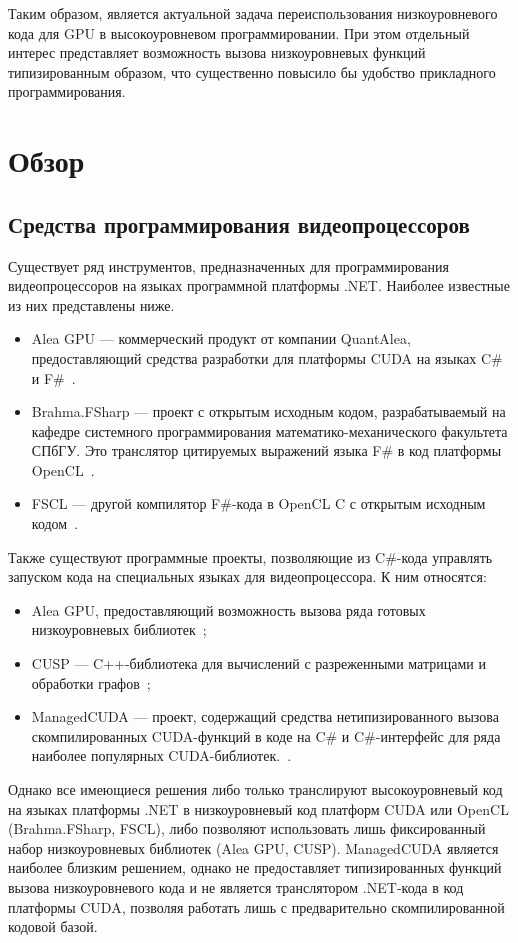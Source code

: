 \documentclass[14pt]{matmex-diploma}
\begin{document}
Таким образом, является актуальной задача переиспользования низкоуровневого кода для GPU в высокоуровневом программировании. При этом отдельный интерес представляет возможность вызова низкоуровневых функций типизированным образом, что существенно повысило бы удобство прикладного программирования.

\section{Обзор}

\subsection{Средства программирования видеопроцессоров}
Существует ряд инструментов, предназначенных для программирования видеопроцессоров на языках программной платформы .NET. Наиболее известные из них представлены ниже.
\begin{itemize}
    \item Alea GPU --- коммерческий продукт от компании QuantAlea, предоставляющий средства разработки для платформы CUDA на языках C\# и F\#~\cite{AleaGPU}.
    \item Brahma.FSharp --- проект с открытым исходным кодом, разрабатываемый на кафедре системного программирования математико-механического факультета СПбГУ. Это транслятор цитируемых выражений языка F\# в код платформы OpenCL~\cite{Brahma_FSharp}.
    \item FSCL --- другой компилятор F\#-кода в OpenCL C с открытым исходным кодом~\cite{FSCL}.
\end{itemize}

Также существуют программные проекты, позволяющие из C\#-кода управлять запуском кода на специальных языках для видеопроцессора. К ним относятся:
\begin{itemize}
    \item Alea GPU, предоставляющий возможность вызова ряда готовых низкоуровневых библиотек~\cite{AleaGPU};
    \item CUSP --- C++-библиотека для вычислений с разреженными матрицами и обработки графов~\cite{CUSP};
    \item ManagedCUDA --- проект, содержащий средства нетипизированного вызова скомпилированных CUDA-функций в коде на C\# и C\#-интерфейс для ряда наиболее популярных CUDA-библиотек.~\cite{ManagedCUDA}.
\end{itemize}

Однако все имеющиеся решения либо только транслируют высокоуровневый код на языках платформы .NET в низкоуровневый код платформ CUDA или OpenCL (Brahma.FSharp, FSCL), либо позволяют использовать лишь фиксированный набор низкоуровневых библиотек (Alea GPU, CUSP). ManagedCUDA является наиболее близким решением, однако не предоставляет типизированных функций вызова низкоуровневого кода и не является транслятором .NET-кода в код платформы CUDA, позволяя работать лишь с предварительно скомпилированной кодовой базой.
\end{document}
